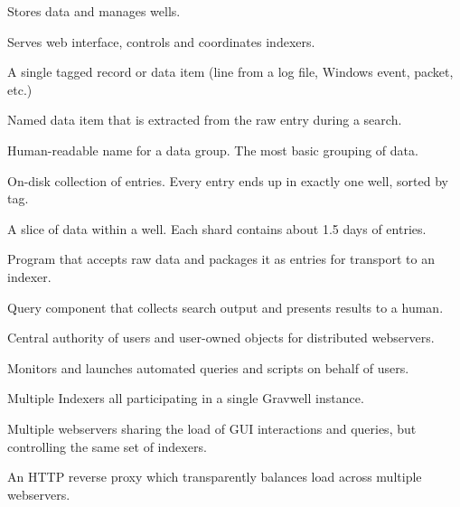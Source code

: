 \begin{description}[font=\sffamily\bfseries, leftmargin=1cm, style=nextline]
\item[Indexer]
Stores data and manages wells.

\item[Webserver]
Serves web interface, controls and coordinates indexers.

\item[Entry]
A single tagged record or data item (line from a log file, Windows event, packet, etc.)

\item[Enumerated Value]
Named data item that is extracted from the raw entry during a search.

\item[Tag]
Human-readable name for a data group. The most basic grouping of data.

\item[Well]
On-disk collection of entries. Every entry ends up in exactly one well, sorted by tag.

\item[Shard]
A slice of data within a well. Each shard contains about 1.5 days of entries.

\item[Ingester]
Program that accepts raw data and packages it as entries for transport to an indexer.

\item[Renderer]
Query component that collects search output and presents results to a human.

\item[Datastore]
Central authority of users and user-owned objects for distributed webservers.

\item[Search Agent]
Monitors and launches automated queries and scripts on behalf of users.

\item[Cluster Deployment]
Multiple Indexers all participating in a single Gravwell instance.

\item[Distributed Webservers]
Multiple webservers sharing the load of GUI interactions and queries, but controlling the same set of indexers.

\item[Load Balancer]
An HTTP reverse proxy which transparently balances load across multiple webservers.
\end{description}

